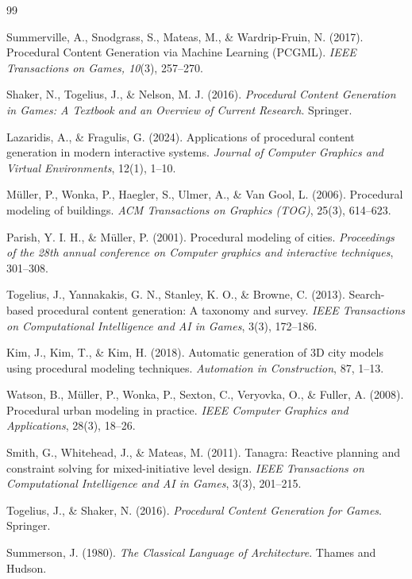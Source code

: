\documentclass[manuscript,screen,12pt]{article}
\begin{document}
\newpage

\begin{thebibliography}{99}

Summerville, A., Snodgrass, S., Mateas, M., \& Wardrip-Fruin, N. (2017). 
Procedural Content Generation via Machine Learning (PCGML). 
\textit{IEEE Transactions on Games, 10}(3), 257–270.

Shaker, N., Togelius, J., \& Nelson, M. J. (2016). 
\textit{Procedural Content Generation in Games: A Textbook and an Overview of Current Research}. 
Springer.

Lazaridis, A., \& Fragulis, G. (2024). 
Applications of procedural content generation in modern interactive systems. 
\textit{Journal of Computer Graphics and Virtual Environments}, 12(1), 1–10.

M{\"u}ller, P., Wonka, P., Haegler, S., Ulmer, A., \& Van Gool, L. (2006). 
Procedural modeling of buildings. 
\textit{ACM Transactions on Graphics (TOG)}, 25(3), 614–623.

Parish, Y. I. H., \& M{\"u}ller, P. (2001). 
Procedural modeling of cities. 
\textit{Proceedings of the 28th annual conference on Computer graphics and interactive techniques}, 301–308.

Togelius, J., Yannakakis, G. N., Stanley, K. O., \& Browne, C. (2013). 
Search-based procedural content generation: A taxonomy and survey. 
\textit{IEEE Transactions on Computational Intelligence and AI in Games}, 3(3), 172–186.

Kim, J., Kim, T., \& Kim, H. (2018). 
Automatic generation of 3D city models using procedural modeling techniques. 
\textit{Automation in Construction}, 87, 1–13.

Watson, B., Müller, P., Wonka, P., Sexton, C., Veryovka, O., \& Fuller, A. (2008). 
Procedural urban modeling in practice. 
\textit{IEEE Computer Graphics and Applications}, 28(3), 18–26.

Smith, G., Whitehead, J., \& Mateas, M. (2011). 
Tanagra: Reactive planning and constraint solving for mixed-initiative level design. 
\textit{IEEE Transactions on Computational Intelligence and AI in Games}, 3(3), 201–215.

Togelius, J., \& Shaker, N. (2016). 
\textit{Procedural Content Generation for Games}. 
Springer.

Summerson, J. (1980). 
\textit{The Classical Language of Architecture}. 
Thames and Hudson.


\end{thebibliography}
\end{document}
